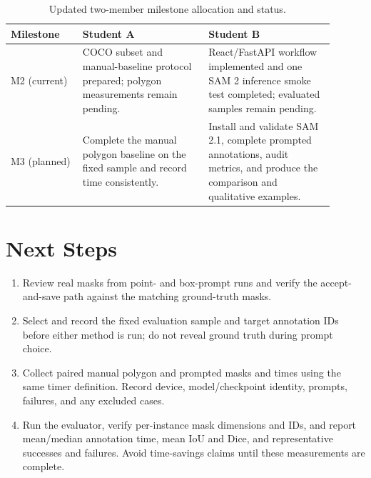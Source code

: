 \documentclass[11pt]{article}
\begin{document}
\begin{table}[ht]
\centering
\caption{Updated two-member milestone allocation and status.}
\label{tab:tasks}
\begin{tabular}{@{}p{0.20\linewidth}p{0.35\linewidth}p{0.35\linewidth}@{}}
\toprule
\textbf{Milestone} & \textbf{Student A} & \textbf{Student B} \\
\midrule
M2 (current) &
COCO subset and manual-baseline protocol prepared; polygon measurements remain pending. &
React/FastAPI workflow implemented and one SAM 2 inference smoke test completed; evaluated samples remain pending. \\
M3 (planned) &
Complete the manual polygon baseline on the fixed sample and record time consistently. &
Install and validate SAM 2.1, complete prompted annotations, audit metrics, and produce the comparison and qualitative examples. \\
\bottomrule
\end{tabular}
\end{table}

\section{Next Steps}
\label{sec:next}
\begin{enumerate}[leftmargin=*]
  \item Review real masks from point- and box-prompt runs and verify the
  accept-and-save path against the matching ground-truth masks.
  \item Select and record the fixed evaluation sample and target annotation IDs
  before either method is run; do not reveal ground truth during prompt choice.
  \item Collect paired manual polygon and prompted masks and times using the
  same timer definition. Record device, model/checkpoint identity, prompts,
  failures, and any excluded cases.
  \item Run the evaluator, verify per-instance mask dimensions and IDs, and
  report mean/median annotation time, mean IoU and Dice, and representative
  successes and failures. Avoid time-savings claims until these measurements
  are complete.
\end{enumerate}



\end{document}
